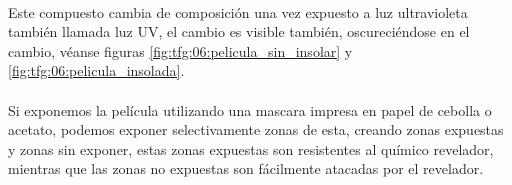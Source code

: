 \paragraph{} Este compuesto cambia de composición una vez expuesto a luz ultravioleta también llamada luz UV, el cambio es visible también, oscureciéndose en el cambio, véanse figuras \ref{fig:tfg:06:pelicula_sin_insolar} y \ref{fig:tfg:06:pelicula_insolada}.

\paragraph{} Si exponemos la película utilizando una mascara impresa en papel de cebolla o acetato, podemos exponer selectivamente zonas de esta, creando zonas expuestas y zonas sin exponer, estas zonas expuestas son resistentes al químico revelador, mientras que las zonas no expuestas son fácilmente atacadas por el revelador.

